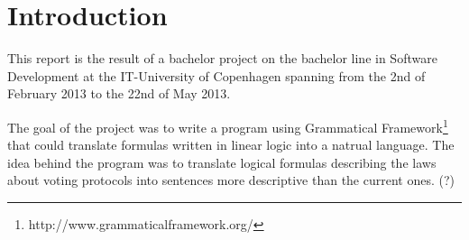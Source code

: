 \chapter{Introduction}
\label{01}

This report is the result of a bachelor project on the bachelor line in Software Development at the IT-University of Copenhagen spanning from the 2nd of February 2013 to the 22nd of May 2013.

The goal of the project was to write a program using Grammatical Framework\footnote{http://www.grammaticalframework.org/} that could translate formulas written in linear logic into a natrual language. The idea behind the program was to translate logical formulas describing the laws about voting protocols into sentences more descriptive than the current ones. (?)
